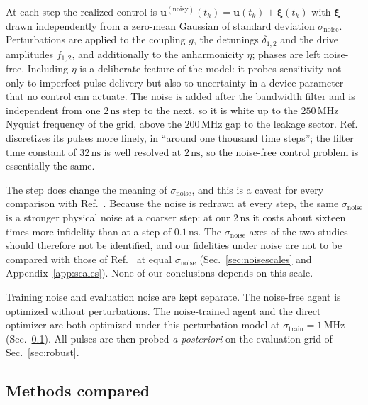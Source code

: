 \documentclass[aps,prx,twocolumn,superscriptaddress,nofootinbib,amsmath,amssymb,floatfix]{revtex4-2}
\newcommand{\snoise}{\sigma_{\mathrm{noise}}}
\newcommand{\strain}{\sigma_{\mathrm{train}}}
\newcommand{\ns}{\,\mathrm{ns}}
\newcommand{\MHz}{\,\mathrm{MHz}}
\begin{document}
At each step the realized control is $\bm{u}^{(\mathrm{noisy})}(t_k)=\bm{u}(t_k)+\bm{\xi}(t_k)$ with
$\bm\xi$ drawn independently from a zero-mean Gaussian of standard deviation $\snoise$. Perturbations
are applied to the coupling $g$, the detunings $\delta_{1,2}$ and the drive amplitudes $f_{1,2}$, and
additionally to the anharmonicity $\eta$; phases are left noise-free. Including $\eta$ is a
deliberate feature of the model: it probes sensitivity not only to imperfect pulse delivery but also
to uncertainty in a device parameter that no control can actuate. The noise is added
after the bandwidth filter and is independent from one $2\ns$ step to the next, so it is white up to
the $250\MHz$ Nyquist frequency of the grid, above the $200\MHz$ gap to the leakage sector.
Ref.~\cite{Niu2019} discretizes its pulses more finely, in ``around one thousand time steps''; the
filter time constant of $32\ns$ is well resolved at $2\ns$, so the noise-free control problem is
essentially the same.

The step does change the meaning of $\snoise$, and this is a caveat for every comparison with
Ref.~\cite{Niu2019}. Because the noise is redrawn at every step, the same $\snoise$ is a stronger physical
noise at a coarser step: at our $2\ns$ it costs about sixteen times more infidelity than at a step of
$0.1\ns$. The $\snoise$ axes of the two studies should therefore not be identified, and our fidelities
under noise are not to be compared with those of Ref.~\cite{Niu2019} at equal $\snoise$
(Sec.~\ref{sec:noisescales} and Appendix~\ref{app:scales}). None of our conclusions depends on this scale.

Training noise and evaluation noise are kept separate. The noise-free agent is optimized without
perturbations. The noise-trained agent and the direct optimizer are both optimized under this
perturbation model at $\strain=1\MHz$ (Sec.~\ref{sec:controllers}). All pulses are then probed
\emph{a posteriori} on the evaluation grid of Sec.~\ref{sec:robust}.

\subsection{Methods compared}
\label{sec:controllers}
\end{document}

